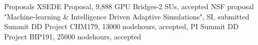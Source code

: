 \begin{rubric}{Proposals}
\entry*[\hspace{1.05cm}2021]%
  XSEDE Proposal, 9,888 GPU Bridges-2 SUs, accepted
\entry*[2020]%
  NSF proposal "Machine-learning \& Intelligence Driven Adaptive Simulations", SI, submitted 
\entry*[2020]%
  Summit DD Project CHM179, 13000 nodehours, accepted, PI
\entry*[2019]%
  Summit DD Project BIP191, 25000 nodehours, accepted 


\end{rubric}